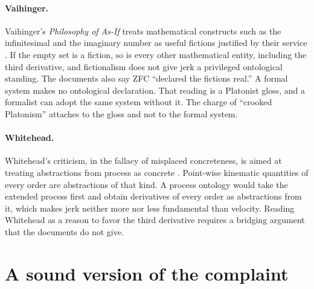 \documentclass[11pt]{article}
\begin{document}
\paragraph{Vaihinger.} Vaihinger's \emph{Philosophy of As-If} treats mathematical constructs such as the infinitesimal and the imaginary number as useful fictions justified by their service \cite{vaihinger1911}. If the empty set is a fiction, so is every other mathematical entity, including the third derivative, and fictionalism does not give jerk a privileged ontological standing. The documents also say ZFC ``declared the fictions real.'' A formal system makes no ontological declaration. That reading is a Platonist gloss, and a formalist can adopt the same system without it. The charge of ``crooked Platonism'' attaches to the gloss and not to the formal system.

\paragraph{Whitehead.} Whitehead's criticism, in the fallacy of misplaced concreteness, is aimed at treating abstractions from process as concrete \cite{whitehead1925,whitehead1929}. Point-wise kinematic quantities of every order are abstractions of that kind. A process ontology would take the extended process first and obtain derivatives of every order as abstractions from it, which makes jerk neither more nor less fundamental than velocity. Reading Whitehead as a reason to favor the third derivative requires a bridging argument that the documents do not give.

\section{A sound version of the complaint}
\end{document}
